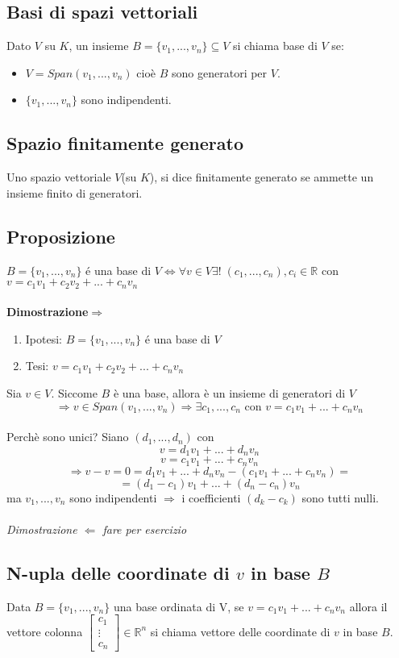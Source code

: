 \subsection{Basi di spazi vettoriali}
Dato \(V\) su \(K\), un insieme \(B=\{v_1,...,v_n\}\subseteq V\) si chiama base di \(V\) se:
\begin{itemize}

	\item \(V=Span(v_1,...,v_n)\) cioè \(B\) sono generatori per \(V\).

	\item \(\{v_1,...,v_n\}\) sono indipendenti.

\end{itemize}

\subsection{Spazio finitamente generato}
Uno spazio vettoriale $V$(su $K$), si dice finitamente generato se ammette un insieme finito di generatori.

\subsection{Proposizione}
$B=\{v_1,...,v_n\}$ é una base di $V\Leftrightarrow \forall v\in V\exists !\;(c_1,...,c_n),c_i\in\mathbb{R}$ con \\$v=c_1v_1+c_2v_2+...+c_nv_n$
\\
\\\textbf{Dimostrazione$\Rightarrow$}
\begin{enumerate}
	\item Ipotesi: $B=\{v_1,...,v_n\}$ é una base di $V$
	\item Tesi: $v=c_1v_1+c_2v_2+...+c_nv_n$
\end{enumerate}
Sia $v\in V$. Siccome $B$ è una base, allora è un insieme di generatori di $V$
\[\Rightarrow v\in Span(v_1,...,v_n)\Rightarrow \exists c_1,...,c_n \text{ con } v=c_1v_1+...+c_nv_n\]
 \\Perchè sono unici? Siano $(d_1,...,d_n)$ con 
 \[v=d_1v_1+...+d_nv_n\]
 \[v=c_1v_1+...+c_nv_n\]
 \[\Rightarrow v-v=0=d_1v_1+...+d_nv_n-(c_1v_1+...+c_nv_n)=\]
 \[=(d_1-c_1)v_1+...+(d_n-c_n)v_n\]
 ma $v_1,...,v_n$ sono indipendenti $\Rightarrow$ i coefficienti $(d_k-c_k)$ sono tutti nulli.
 \\
 \\\textit{Dimostrazione $\Leftarrow$ fare per esercizio}

 \subsection{N-upla delle coordinate di $v$ in base $B$}
 Data $B=\{v_1,...,v_n\}$ una base ordinata di V, se $v=c_1v_1+...+c_nv_n$ allora il vettore colonna $\begin{bmatrix}c_1\\\vdots\\c_n\end{bmatrix}\in\mathbb{R}^n$ si chiama vettore delle coordinate di $v$ in base $B$.

